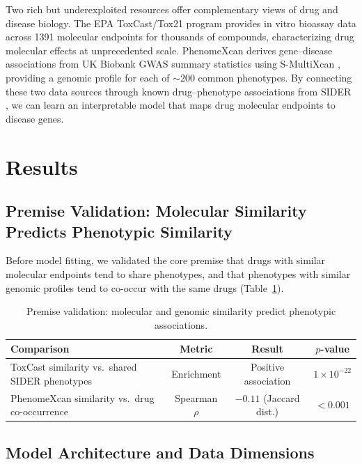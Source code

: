 \documentclass[11pt]{article}
\begin{document}
Two rich but underexploited resources offer complementary views of drug and disease biology. The EPA ToxCast/Tox21 program \citep{richard2018toxcast} provides in vitro bioassay data across 1391 molecular endpoints for thousands of compounds, characterizing drug molecular effects at unprecedented scale. PhenomeXcan \citep{pividori2020phenomexcan} derives gene--disease associations from UK Biobank GWAS summary statistics \citep{bycroft2018ukbiobank} using S-MultiXcan \citep{barbeira2018smultixcan}, providing a genomic profile for each of ${\sim}$200 common phenotypes. By connecting these two data sources through known drug--phenotype associations from SIDER \citep{kuhn2016sider}, we can learn an interpretable model that maps drug molecular endpoints to disease genes.

\section{Results}

\subsection{Premise Validation: Molecular Similarity Predicts Phenotypic Similarity}

Before model fitting, we validated the core premise that drugs with similar molecular endpoints tend to share phenotypes, and that phenotypes with similar genomic profiles tend to co-occur with the same drugs (Table~\ref{tab:premise}).

\begin{table}[H]
\centering
\caption{Premise validation: molecular and genomic similarity predict phenotypic associations.}
\label{tab:premise}
\begin{tabular}{lccc}
\toprule
\textbf{Comparison} & \textbf{Metric} & \textbf{Result} & \textbf{$p$-value} \\
\midrule
ToxCast similarity vs.\ shared SIDER phenotypes & Enrichment & Positive association & $1 \times 10^{-22}$ \\
PhenomeXcan similarity vs.\ drug co-occurrence & Spearman $\rho$ & $-0.11$ (Jaccard dist.) & $<0.001$ \\
\bottomrule
\end{tabular}
\end{table}

\subsection{Model Architecture and Data Dimensions}
\end{document}
